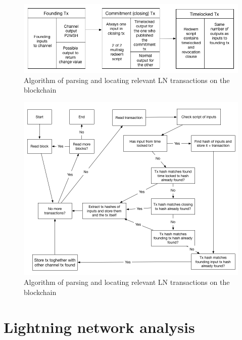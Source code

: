 \begin{figure}[h]
    \centering
    \includegraphics[width=12cm]{figures/lnchainTimelock.png}
    \caption{Algorithm of parsing and locating relevant LN transactions on the blockchain}
    \label{fig:htlc_bc}
\end{figure}

\begin{figure}[h]
    \centering
    \includegraphics[width=14cm]{figures/algorithm.png}
    \caption{Algorithm of parsing and locating relevant LN transactions on the blockchain}
    \label{fig:htlc_bc}
\end{figure}


\section{Lightning network analysis}
